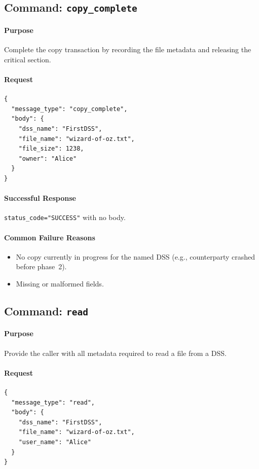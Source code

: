 \documentclass[11pt]{article}
\begin{document}
\subsection{Command: \texttt{copy\_complete}}
\paragraph{Purpose} Complete the copy transaction by recording the file metadata and releasing the critical section.

\paragraph{Request}
\begin{verbatim}
{
  "message_type": "copy_complete",
  "body": {
    "dss_name": "FirstDSS",
    "file_name": "wizard-of-oz.txt",
    "file_size": 1238,
    "owner": "Alice"
  }
}
\end{verbatim}

\paragraph{Successful Response} \texttt{status\_code="SUCCESS"} with no body.

\paragraph{Common Failure Reasons}
\begin{itemize}
  \item No copy currently in progress for the named DSS (e.g., counterparty crashed before phase~2).
  \item Missing or malformed fields.
\end{itemize}

\subsection{Command: \texttt{read}}
\paragraph{Purpose} Provide the caller with all metadata required to read a file from a DSS.

\paragraph{Request}
\begin{verbatim}
{
  "message_type": "read",
  "body": {
    "dss_name": "FirstDSS",
    "file_name": "wizard-of-oz.txt",
    "user_name": "Alice"
  }
}
\end{verbatim}
\end{document}
